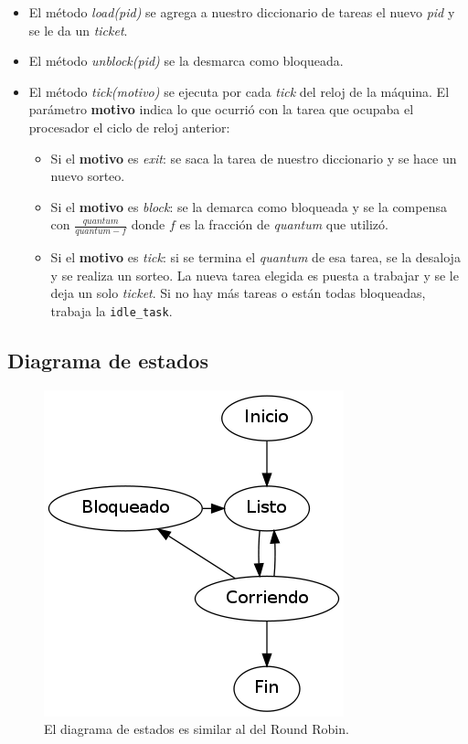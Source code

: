\begin{itemize}
	\item El método \emph{load(pid)} se agrega a nuestro diccionario de tareas el nuevo \emph{pid} y se le da un \emph{ticket}.
	\item El método \emph{unblock(pid)} se la desmarca como bloqueada.
	\item El método \emph{tick(motivo)} se ejecuta por cada \emph{tick} del reloj de la máquina. El parámetro \textbf{motivo} indica lo que ocurrió con la tarea que ocupaba el procesador el ciclo de reloj anterior:
	
	\begin{itemize}
		\item Si el \textbf{motivo} es \emph{exit}: se saca la tarea de nuestro diccionario y se hace un nuevo sorteo.
		\item Si el \textbf{motivo} es \emph{block}: se la demarca como bloqueada y se la compensa con $\frac{quantum}{quantum - f}$ donde $f$ es la fracción de \emph{quantum} que utilizó.
		\item Si el \textbf{motivo} es \emph{tick}: si se termina el \emph{quantum} de esa tarea, se la desaloja y se realiza un sorteo. La nueva tarea elegida es puesta a trabajar y se le deja un solo \emph{ticket}. Si no hay más tareas o están todas bloqueadas, trabaja la \verb|idle_task|.
	\end{itemize}
\end{itemize}

\subsection{Diagrama de estados}
\begin{figure}[H]
\centering
\includegraphics[scale=0.5]{estados.png}
\caption{El diagrama de estados es similar al del Round Robin.}
\end{figure}

